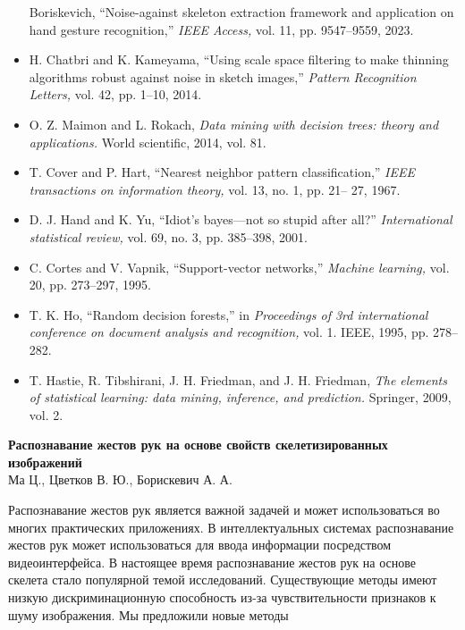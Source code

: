 \documentclass[twocolumn]{article}
\begin{document}
\begin{itemize}
Boriskevich, “Noise-against skeleton extraction framework and
application on hand gesture recognition,” \textit{IEEE Access,} vol. 11,
pp. 9547–9559, 2023.
\renewcommand{\labelitemi}{[30]}
  \item H. Chatbri and K. Kameyama, “Using scale space filtering to
make thinning algorithms robust against noise in sketch images,”
\textit{Pattern Recognition Letters,} vol. 42, pp. 1–10, 2014.
\renewcommand{\labelitemi}{[31]}
  \item O. Z. Maimon and L. Rokach, \textit{Data mining with decision trees:
theory and applications.} World scientific, 2014, vol. 81.
\renewcommand{\labelitemi}{[32]}
  \item T. Cover and P. Hart, “Nearest neighbor pattern classification,”
\textit{IEEE transactions on information theory,} vol. 13, no. 1, pp. 21–
27, 1967.
\renewcommand{\labelitemi}{[33]}
  \item D. J. Hand and K. Yu, “Idiot’s bayes—not so stupid after all?”
\textit{International statistical review,} vol. 69, no. 3, pp. 385–398, 2001.
\renewcommand{\labelitemi}{[34]}
  \item C. Cortes and V. Vapnik, “Support-vector networks,” \textit{Machine
learning,} vol. 20, pp. 273–297, 1995.
\renewcommand{\labelitemi}{[35]}
  \item T. K. Ho, “Random decision forests,” in \textit{Proceedings of 3rd
international conference on document analysis and recognition,}
vol. 1. IEEE, 1995, pp. 278–282.
\renewcommand{\labelitemi}{[36]}
  \item T. Hastie, R. Tibshirani, J. H. Friedman, and J. H. Friedman,
\textit{The elements of statistical learning: data mining, inference, and
prediction.} Springer, 2009, vol. 2.
\end{itemize}
\newpage
\begin{center}
\large
\textbf{Распознавание жестов рук на основе
свойств скелетизированных изображений} \\
Ма Ц., Цветков В. Ю., Борискевич А. А.
\end{center}
\normalsize
\par Распознавание жестов рук является важной задачей и может использоваться во многих практических приложениях. В интеллектуальных системах
распознавание жестов рук может использоваться для
ввода информации посредством видеоинтерфейса. В
настоящее время распознавание жестов рук на основе скелета стало популярной темой исследований.
Существующие методы имеют низкую дискриминационную способность из-за чувствительности признаков
к шуму изображения. Мы предложили новые методы
\end{document}
